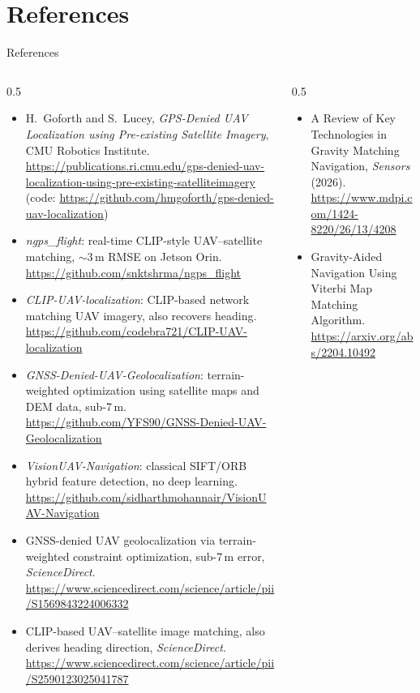 \documentclass[compress,aspectratio=169]{beamer}
\begin{document}
\section{References}
\begin{frame}[t]{References}
\tiny
\begin{columns}[t,onlytextwidth]
\begin{column}{0.5\textwidth}
\begin{itemize}
\itemsep 0.35em
\item[{[1]}] H.~Goforth and S.~Lucey, \emph{GPS-Denied UAV Localization using Pre-existing Satellite Imagery}, CMU Robotics Institute. \url{https://publications.ri.cmu.edu/gps-denied-uav-localization-using-pre-existing-satelliteimagery} (code: \url{https://github.com/hmgoforth/gps-denied-uav-localization})
\item[{[2]}] \emph{ngps\_flight}: real-time CLIP-style UAV--satellite matching, $\sim$3\,m RMSE on Jetson Orin. \url{https://github.com/snktshrma/ngps_flight}
\item[{[3]}] \emph{CLIP-UAV-localization}: CLIP-based network matching UAV imagery, also recovers heading. \url{https://github.com/codebra721/CLIP-UAV-localization}
\item[{[4]}] \emph{GNSS-Denied-UAV-Geolocalization}: terrain-weighted optimization using satellite maps and DEM data, sub-7\,m. \url{https://github.com/YFS90/GNSS-Denied-UAV-Geolocalization}
\item[{[5]}] \emph{VisionUAV-Navigation}: classical SIFT/ORB hybrid feature detection, no deep learning. \url{https://github.com/sidharthmohannair/VisionUAV-Navigation}
\item[{[6]}] GNSS-denied UAV geolocalization via terrain-weighted constraint optimization, sub-7\,m error, \emph{ScienceDirect}. \url{https://www.sciencedirect.com/science/article/pii/S1569843224006332}
\item[{[7]}] CLIP-based UAV--satellite image matching, also derives heading direction, \emph{ScienceDirect}. \url{https://www.sciencedirect.com/science/article/pii/S2590123025041787}
\end{itemize}
\end{column}
\begin{column}{0.5\textwidth}
\begin{itemize}
\itemsep 0.35em
\item[{[8]}] A Review of Key Technologies in Gravity Matching Navigation, \emph{Sensors} (2026). \url{https://www.mdpi.com/1424-8220/26/13/4208}
\item[{[9]}] Gravity-Aided Navigation Using Viterbi Map Matching Algorithm. \url{https://arxiv.org/abs/2204.10492}

\end{itemize}
\end{column}
\end{columns}
\end{frame}
\end{document}
